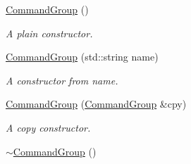 \begin{DoxyCompactItemize}
\item 
\hypertarget{class_r_c_f_1_1_server_1_1_command_group_a850fbf1e53b8f26a0c3fe5527250d9d9}{}\hyperlink{class_r_c_f_1_1_server_1_1_command_group_a850fbf1e53b8f26a0c3fe5527250d9d9}{Command\+Group} ()\label{class_r_c_f_1_1_server_1_1_command_group_a850fbf1e53b8f26a0c3fe5527250d9d9}

\begin{DoxyCompactList}\small\item\em A plain constructor. \end{DoxyCompactList}\item 
\hyperlink{class_r_c_f_1_1_server_1_1_command_group_acf672a4d97c06a89f4c83f0aeefb0b3b}{Command\+Group} (std\+::string name)
\begin{DoxyCompactList}\small\item\em A constructor from name. \end{DoxyCompactList}\item 
\hyperlink{class_r_c_f_1_1_server_1_1_command_group_a60cbac1271e03939e0bd906c12436695}{Command\+Group} (\hyperlink{class_r_c_f_1_1_server_1_1_command_group}{Command\+Group} \&cpy)
\begin{DoxyCompactList}\small\item\em A copy constructor. \end{DoxyCompactList}\item 
\hypertarget{class_r_c_f_1_1_server_1_1_command_group_a1c7e8249006e32e09206b171ba724afc}{}\hyperlink{class_r_c_f_1_1_server_1_1_command_group_a1c7e8249006e32e09206b171ba724afc}{$\sim$\+Command\+Group} ()\label{class_r_c_f_1_1_server_1_1_command_group_a1c7e8249006e32e09206b171ba724afc}


\end{DoxyCompactItemize}
